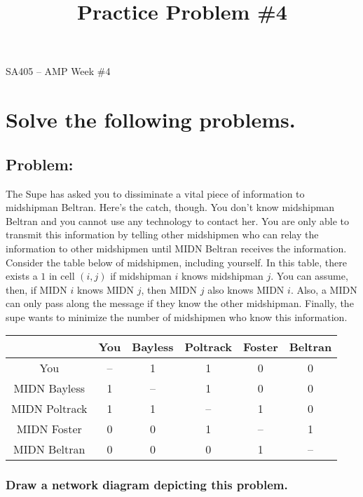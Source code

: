 \documentclass[11pt]{article}
\makeatletter
\theoremstyle{definition}
\renewcommand{\maketitle}{
  \noindent SA405 -- AMP \hfill Week \#4\\

  \begin{center}\Large{\textbf{\@title}}\end{center}
}
\makeatother
\begin{document}
  
\title{Practice Problem \#4}

\maketitle



\section{Solve the following problems.}
\subsection{Problem:}

The Supe has asked you to dissiminate a vital piece of information to midshipman Beltran. Here's the catch, though. You don't know midshipman Beltran and you cannot use any technology to contact her. You are only able to transmit this information by telling other midshipmen who can relay the information to other midshipmen until MIDN Beltran receives the information. Consider the table below of midshipmen, including yourself. In this table, there exists a $1$ in cell $(i,j)$ if midshipman $i$ knows midshipman $j$. You can assume, then, if MIDN $i$ knows MIDN $j$, then MIDN $j$ also knows MIDN $i$. Also, a MIDN can only pass along the message if they know the other midshipman. Finally, the supe wants to minimize the number of midshipmen who know this information.

\begin{center}
\begin{tabular}{|c|c|c|c|c|c|}
\hline
 & You &Bayless & Poltrack& Foster&Beltran \\ \hline
You &-- &1 &1 & 0& 0 \\ \hline
MIDN Bayless & 1 &-- &1 &0 & 0 \\ \hline
MIDN Poltrack &1 &1 &-- & 1 & 0 \\ \hline
MIDN Foster& 0&0  &1 &-- &1 \\ \hline
MIDN Beltran & 0 &0 &0 &1 &-- \\ \hline
\end{tabular}
\end{center}
 

\subsubsection{Draw a network diagram depicting this problem.}
\vfill
\newpage
\end{document}
